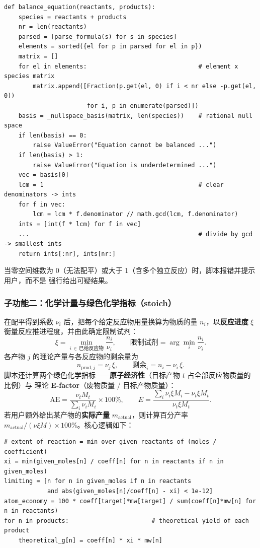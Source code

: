 \documentclass[UTF8,a4paper,12pt]{ctexart}
\begin{document}
\begin{lstlisting}
def balance_equation(reactants, products):
    species = reactants + products
    nr = len(reactants)
    parsed = [parse_formula(s) for s in species]
    elements = sorted({el for p in parsed for el in p})
    matrix = []
    for el in elements:                               # element x species matrix
        matrix.append([Fraction(p.get(el, 0) if i < nr else -p.get(el, 0))
                       for i, p in enumerate(parsed)])
    basis = _nullspace_basis(matrix, len(species))    # rational null space
    if len(basis) == 0:
        raise ValueError("Equation cannot be balanced ...")
    if len(basis) > 1:
        raise ValueError("Equation is underdetermined ...")
    vec = basis[0]
    lcm = 1                                           # clear denominators -> ints
    for f in vec:
        lcm = lcm * f.denominator // math.gcd(lcm, f.denominator)
    ints = [int(f * lcm) for f in vec]
    ...                                               # divide by gcd -> smallest ints
    return ints[:nr], ints[nr:]
\end{lstlisting}

当零空间维数为 0（无法配平）或大于 1（含多个独立反应）时，脚本报错并提示用户，而不是
强行给出可疑结果。

\subsubsection{子功能二：化学计量与绿色化学指标（stoich）}

在配平得到系数 $\nu_i$ 后，把每个给定反应物用量换算为物质的量 $n_i$，以\textbf{反应进度}
$\xi$ 衡量反应推进程度，并由此确定限制试剂：
\[
    \xi = \min_{i\,\in\,\text{已给反应物}} \frac{n_i}{\nu_i},
    \qquad \text{限制试剂} = \arg\min_i \frac{n_i}{\nu_i}.
\]
各产物 $j$ 的理论产量与各反应物的剩余量为
\[
    n_{\text{prod},j} = \nu_j\,\xi,\qquad
    \text{剩余}_i = n_i - \nu_i\,\xi .
\]
脚本还计算两个绿色化学指标——\textbf{原子经济性}（目标产物 $t$ 占全部反应物质量的比例）与
理论 \textbf{E-factor}（废物质量 / 目标产物质量）：
\[
    \mathrm{AE} = \frac{\nu_t M_t}{\sum_i \nu_i M_i}\times100\%,
    \qquad
    E = \frac{\sum_i \nu_i\xi M_i - \nu_t\xi M_t}{\nu_t\xi M_t}.
\]
若用户额外给出某产物的\textbf{实际产量} $m_\text{actual}$，则计算百分产率
$m_\text{actual}/(\nu\xi M)\times100\%$。核心逻辑如下：

\begin{lstlisting}
# extent of reaction = min over given reactants of (moles / coefficient)
xi = min(given_moles[n] / coeff[n] for n in reactants if n in given_moles)
limiting = [n for n in given_moles if n in reactants
            and abs(given_moles[n]/coeff[n] - xi) < 1e-12]
atom_economy = 100 * coeff[target]*mw[target] / sum(coeff[n]*mw[n] for n in reactants)
for n in products:                       # theoretical yield of each product
    theoretical_g[n] = coeff[n] * xi * mw[n]
\end{lstlisting}
\end{document}
